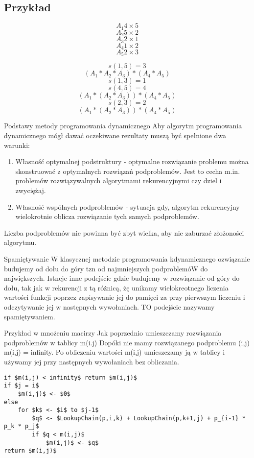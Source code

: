 \subsection{Przykład}
$$ A_1 4 \times 5 $$
$$ A_2 5 \times 2 $$
$$ A_3 2 \times 1 $$
$$ A_4 1 \times 2 $$
$$ A_5 2 \times 3 $$

%

$$s(1,5) = 3$$
$$(A_1 * A_2 * A_3) * (A_4 * A_5)$$
$$s(1,3) = 1$$
$$s(4,5) = 4$$
$$(A_1 * (A_2 * A_3)) * (A_4 * A_5)$$
$$s(2,3) = 2$$
$$(A_1 * (A_2 * A_3)) * (A_4 * A_5)$$

Podstawy metody programowania dynamicznego
Aby algorytm programowania dynamicznego mógł dawać oczekiwane rezultaty muszą być spełnione dwa warunki:

\begin{enumerate}
\item Własność optymalnej podstruktury - optymalne rozwiązanie problemu można skonstruować z optymalnych rozwiązań podproblemów. Jest to cecha m.in. problemów rozwiązywalnych algorytmami rekurencyjnymi czy dziel i zwyciężaj.
\item Własność wspólnych podproblemów - sytuacja gdy, algorytm rekurencyjny wielokrotnie oblicza rozwiązanie tych samych podproblemów.
\end{enumerate}
Liczba podproblemów nie powinna być zbyt wielka, aby nie zaburzać złożoności algorytmu.

Spamiętywanie
W klasycznej metodzie programowania kdynamicznego ozwiązanie budujemy od dołu do góry tzn od najmniejszych podproblemóW do największych. Istneje inne podejście gdzie budujemy w rozwiązanie od góry do dołu, tak jak w rekurencji z tą różnicą, żę unikamy wielokreotnego liczenia wartości funkcji poprzez zapisywanie jej do pamięci za przy pierwszym liczeniu  i odczytywanie jej w następnych wywołaniach. TO podejście nazywamy spamiętywaniem.

Przykład w mnożeniu macirzy
Jak poprzednio umieszczamy rozwiązania podproblemów w tablicy m(i.j) Dopóki nie mamy rozwiązanego podproblemu (i,j)  m(i,j) = infinity. Po obliczeniu wartości m(i,j) umieszczamy ją w tablicy i używamy jej przy następnych wywołaniach bez obliczania.

\begin{lstlisting}[caption={Algorytm LookupChain(p,i,j) //p - ciąg wymiarów macierzy}]
if $m(i,j) < infinity$ return $m(i,j)$
if $j = i$ 
	$m(i,j)$ <- $0$
else
	for $k$ <- $i$ to $j-1$
		$q$ <- $LookupChain(p,i,k) + LookupChain(p,k+1,j) + p_{i-1} * p_k * p_j$
		if $q < m(i,j)$
			$m(i,j)$ <- $q$
return $m(i,j)$
\end{lstlisting}

